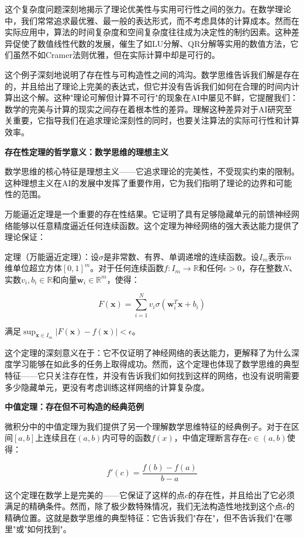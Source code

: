 这个复杂度问题深刻地揭示了理论优美性与实用可行性之间的张力。在数学理论中，我们常常追求最优雅、最一般的表达形式，而不考虑具体的计算成本。然而在实际应用中，算法的时间复杂度和空间复杂度往往成为决定性的制约因素。这种差异促使了数值线性代数的发展，催生了如LU分解、QR分解等实用的数值方法，它们虽然不如Cramer法则优雅，但在实际计算中却是可行的。

这个例子深刻地说明了存在性与可构造性之间的鸿沟。数学思维告诉我们解是存在的，并且给出了理论上完美的表达式，但它并没有告诉我们如何在合理的时间内计算出这个解。这种"理论可解但计算不可行"的现象在AI中屡见不鲜，它提醒我们：数学的完美与计算的现实之间存在着根本性的差异。理解这种差异对于AI研究至关重要，它指导我们在追求理论深刻性的同时，也要关注算法的实际可行性和计算效率。

\textbf{存在性定理的哲学意义：数学思维的理想主义}

数学思维的核心特征是理想主义——它追求理论的完美性，不受现实约束的限制。这种理想主义在AI的发展中发挥了重要作用，它为我们指明了理论的边界和可能性的范围。

万能逼近定理是一个重要的存在性结果。它证明了具有足够隐藏单元的前馈神经网络能够以任意精度逼近任何连续函数。这个定理为神经网络的强大表达能力提供了理论保证：

定理（万能逼近定理）：设$\sigma$是非常数、有界、单调递增的连续函数。设$I_m$表示$m$维单位超立方体$[0,1]^m$。对于任何连续函数$f: I_m \to \mathbb{R}$和任何$\epsilon > 0$，存在整数$N$、实数$v_i, b_i \in \mathbb{R}$和向量$\mathbf{w}_i \in \mathbb{R}^m$，使得：

$$F(\mathbf{x}) = \sum_{i=1}^{N} v_i \sigma(\mathbf{w}_i^T \mathbf{x} + b_i)$$

满足$\sup_{\mathbf{x} \in I_m} |F(\mathbf{x}) - f(\mathbf{x})| < \epsilon$。

这个定理的深刻意义在于：它不仅证明了神经网络的表达能力，更解释了为什么深度学习能够在如此多的任务上取得成功。然而，这个定理也体现了数学思维的典型特征——它只关注存在性，并没有告诉我们如何找到这样的网络，也没有说明需要多少隐藏单元，更没有考虑训练这样网络的计算复杂度。

\textbf{中值定理：存在但不可构造的经典范例}

微积分中的中值定理为我们提供了另一个理解数学思维特征的经典例子。对于在区间$[a,b]$上连续且在$(a,b)$内可导的函数$f(x)$，中值定理断言存在$c \in (a,b)$使得：

$$f'(c) = \frac{f(b) - f(a)}{b - a}$$

这个定理在数学上是完美的——它保证了这样的点$c$的存在性，并且给出了它必须满足的精确条件。然而，除了极少数特殊情况，我们无法构造性地找到这个点$c$的精确位置。这就是数学思维的典型特征：它告诉我们"存在"，但不告诉我们"在哪里"或"如何找到"。

